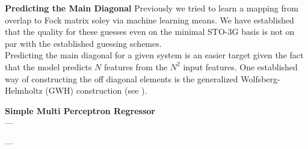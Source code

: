 \textbf{Predicting the Main Diagonal}
Previously we tried to learn a mapping from overlap to Fock matrix soley via machine learning means. We have established that the quality for these guesses even on the minimal STO-3G basis is not on par with the established guessing schemes.\\
Predicting the main diagonal for a given system is an easier target given the fact that the model predicts $N$ features from the $N^2$ input features. One established way of constructing the off diagonal elements is the generalized Wolfsberg-Helmholtz (GWH) construction \parencite{ref:gwh_wolfsberg1952spectra} (see ).

\textbf{Simple Multi Perceptron Regressor}\\


--- 
\begin{table}[h]
    \centering
    \caption{\TODO{\dots} Comparison of different guessing schemes for 102 (20\%) test samples from the  subset from QM9 \parencite{ref:article1_qm9}. The F-score is calculated using the Fock matrix prediction from the Ridge regression model and various guessing schemes implemented in \textsc{PySCF}. The number of iterations until convergence is shown as well as the percentage samples not converging within 50 iterations and the inference time as a factor of the inference time of the minao guess.}
    \label{tab:NN_basic_metrics}
\end{table}
---



